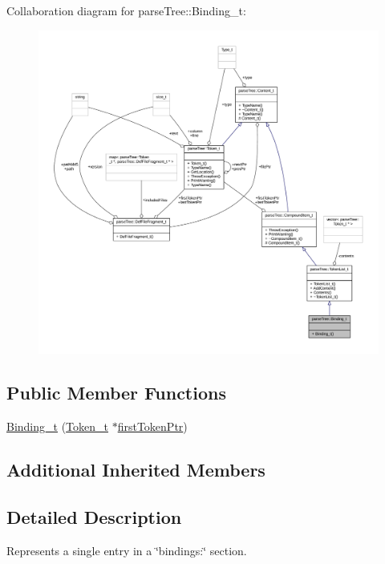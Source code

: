 Collaboration diagram for parse\+Tree\+:\+:Binding\+\_\+t\+:
\nopagebreak
\begin{figure}[H]
\begin{center}
\leavevmode
\includegraphics[width=350pt]{structparse_tree_1_1_binding__t__coll__graph}
\end{center}
\end{figure}
\subsection*{Public Member Functions}
\begin{DoxyCompactItemize}
\item 
\hyperlink{structparse_tree_1_1_binding__t_ab0a8c3e75ae74ea8bfc83bf2f37f792d}{Binding\+\_\+t} (\hyperlink{structparse_tree_1_1_token__t}{Token\+\_\+t} $\ast$\hyperlink{structparse_tree_1_1_compound_item__t_a587020c943e760cb0152dd8cd31e21ef}{first\+Token\+Ptr})
\end{DoxyCompactItemize}
\subsection*{Additional Inherited Members}


\subsection{Detailed Description}
Represents a single entry in a \char`\"{}bindings\+:\char`\"{} section. 


